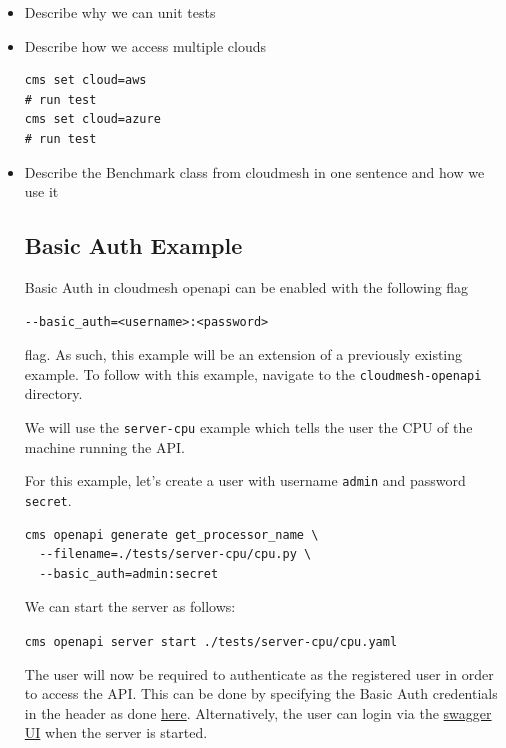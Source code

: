 \begin{itemize}
\item
  Describe why we can unit tests
\item
  Describe how we access multiple clouds

\begin{verbatim}
cms set cloud=aws
# run test
cms set cloud=azure
# run test
\end{verbatim}
\item
  Describe the Benchmark class from cloudmesh in one sentence and how we
  use it

  \subsection{Basic Auth
  Example}\label{a.5.-basic-auth-example}

  Basic Auth in cloudmesh openapi can be enabled with the following flag

\begin{verbatim}
--basic_auth=<username>:<password>
\end{verbatim}

  flag. As such, this example will be an extension of a previously
  existing example. To follow with this example, navigate to the
  \verb|cloudmesh-openapi| directory.

  We will use the \verb|server-cpu| example which tells the user the
  CPU of the machine running the API.

  For this example, let's create a user with username \verb|admin| and
  password \verb|secret|.

\begin{verbatim}
cms openapi generate get_processor_name \
  --filename=./tests/server-cpu/cpu.py \
  --basic_auth=admin:secret
\end{verbatim}

  We can start the server as follows:
  
  \verb|cms openapi server start ./tests/server-cpu/cpu.yaml|

  The user will now be required to authenticate as the registered user
  in order to access the API. This can be done by specifying the Basic
  Auth credentials in the header as done
  \href{https://developer.mozilla.org/en-US/docs/Web/HTTP/Headers/Authorization}{here}.
  Alternatively, the user can login via the
  \href{http://localhost:8080/cloudmesh/u}{swagger UI} when the server
  is started.
\end{itemize}

